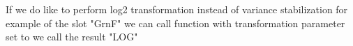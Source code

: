 If we do like to perform log2 transformation instead of variance stabilization for example of the slot "GrnF" we can call function  with transformation parameter set to  we call the result "LOG"